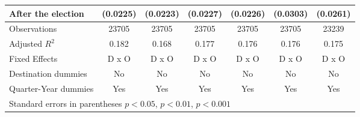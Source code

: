 \begin{table}[htbp]
\begin{tabular}{l*{6}{c}}
After the election                    &    (0.0225)         &    (0.0223)         &    (0.0227)         &    (0.0226)         &    (0.0303)         &    (0.0261)         \\
\hline
Observations        &       23705         &       23705         &       23705         &       23705         &       23705         &       23239         \\
Adjusted \(R^{2}\)  &       0.182         &       0.168         &       0.177         &       0.176         &       0.176         &       0.175         \\
Fixed Effects       &       D x O         &       D x O         &       D x O         &       D x O         &       D x O         &       D x O         \\
Destination dummies &          No         &          No         &          No         &          No         &          No         &          No         \\
Quarter-Year dummies&         Yes         &         Yes         &         Yes         &         Yes         &         Yes         &         Yes         \\
\hline\hline
\multicolumn{7}{l}{Standard errors in parentheses \sym{*} \(p<0.05\), \sym{**} \(p<0.01\), \sym{***} \(p<0.001\)}\\
\end{tabular}
\end{table}
